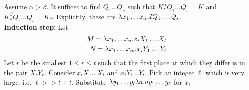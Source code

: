 Assume $\alpha > \beta$. It suffices to find $Q_1\ldots Q_s$ such that $K_*^{\alpha}Q_1\ldots Q_s = K$ and $K_*^{\beta}Q_1\ldots Q_s = K_*$. Explicitly, these are $\lambda x_1\ldots x_\alpha . I Q_1\ldots Q_s$.\\

\textbf{Induction step:} Let
\begin{eqnarray*}
  M = \lambda x_1\ldots x_n . x_i X_1\ldots X_t\\
  N = \lambda x_1\ldots x_m . x_i Y_1\ldots Y_t\\
\end{eqnarray*}
Let $r$ be the smallest $1 \leq r \leq t$ such that the first place at which they differ is in the pair $X_rY_r$. Consider $x_iX_1\ldots X_t$ and $x_iY_1\ldots Y_t$. Pick an integer $\ell$ which is very large, i.e. $\ell >> t + t$. Substitute $\lambda y_1\ldots y_\ell \lambda a. a y_1\ldots y_\ell$ for $x_1$.